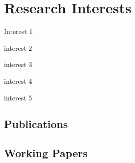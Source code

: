 \documentclass[11pt]{article}
\begin{document}


\section*{Research Interests}

\hspace{-.25em}\begin{itemize*}[itemjoin={{; }}, label={}]
\item Interest 1
\item interest 2
\item interest 3
\item interest 4
\item interest 5
\end{itemize*}



\begin{refsection}
\section*{Publications}
\nocite{*}                          %
\printbibliography[heading = none,  %
keyword = article,                  %
env = mybib]                        %
\end{refsection}


\begin{refsection}
\section*{Working Papers}
\nocite{*}
\printbibliography[heading = none, keyword = working, env = mybib]
\end{refsection}
\end{document}
